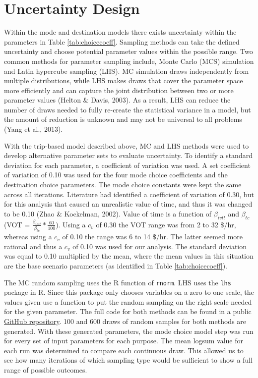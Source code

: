 \documentclass[fancy, masters,twoside]{byuthesis}
\begin{document}
\hypertarget{uncertainty-design}{%
\section{Uncertainty Design}\label{uncertainty-design}}

Within the mode and destination models there exists uncertainty within the parameters in Table \ref{tab:choicecoeff}. Sampling methods can take the defined uncertainty and choose potential parameter values within the possible range. Two common methods for parameter sampling include, Monte Carlo (MCS) simulation and Latin hypercube sampling (LHS). MC simulation draws independently from multiple distributions, while LHS makes draws that cover the parameter space more efficiently and can capture the joint distribution between two or more parameter values (Helton \& Davis, 2003). As a result, LHS can reduce the number of draws needed to fully re-create the statistical variance in a model, but the amount of reduction is unknown and may not be universal to all problems (Yang et al., 2013).

With the trip-based model described above, MC and LHS methods were used to develop alternative parameter sets to evaluate uncertainty. To identify a standard deviation for each parameter, a coefficient of variation was used. A set coefficient of variation of 0.10 was used for the four mode choice coefficients and the destination choice parameters. The mode choice constants were kept the same across all iterations. Literature had identified a coefficient of variation of 0.30, but for this analysis that caused an unrealistic value of time, and thus it was changed to be 0.10 (Zhao \& Kockelman, 2002). Value of time is a function of \(\beta_{ivtt}\) and \(\beta_{tc}\) (VOT = \(\frac{\beta_{ivtt}}{\beta_{tc}}*\frac{60}{100}\)). Using a \(c_v\) of 0.30 the VOT range was from 2 to 32 \(\$\)/hr, whereas using a \(c_v\) of 0.10 the range was 6 to 14 \(\$\)/hr. The latter seemed more rational and thus a \(c_v\) of 0.10 was used for our analysis. The standard deviation was equal to 0.10 multiplied by the mean, where the mean values in this situation are the base scenario parameters (as identified in Table \ref{tab:choicecoeff}).

The MC random sampling uses the R function of \texttt{rnorm}. LHS uses the \texttt{lhs} package in R. Since this package only chooses variables on a zero to one scale, the values given use a function to put the random sampling on the right scale needed for the given parameter. The full code for both methods can be found in a public \href{https://github.com/natmaegray/sensitivity_thesis}{GitHub repository}. 100 and 600 draws of random samples for both methods are generated. With these generated parameters, the mode choice model step was run for every set of input parameters for each purpose. The mean logsum value for each run was determined to compare each continuous draw. This allowed us to see how many iterations of which sampling type would be sufficient to show a full range of possible outcomes.
\end{document}
